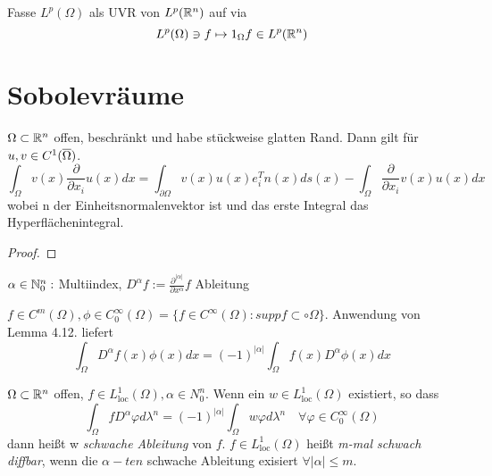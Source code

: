 \documentclass[ngerman]{report}
\begin{document}
	\begin{bem*}
		Fasse $L^p(\Omega)$ als UVR von $L^p(\mathbb{R}^n)$ auf via
			$$ L^p(\Omega) \ni f \mapsto 1_\Omega f \in L^p(\mathbb{R}^n)$$
	\end{bem*}

	\section{Sobolevräume}

		\begin{lemma}
			$\Omega \subset \mathbb{R}^n$ offen, beschränkt und habe stückweise glatten Rand. Dann gilt für $u,v \in C^1(\overline{\Omega})$.
				$$\int_\Omega v(x) \frac{\partial}{\partial x_i} u(x) dx = 
				\int_{\partial \Omega} v(x)u(x) e_i^T n(x) ds(x) - \int_\Omega \frac{\partial}{\partial x_i} v(x) u(x) dx$$
				wobei n der Einheitsnormalenvektor ist und das erste Integral das Hyperflächenintegral.
		\end{lemma}
		\begin{proof}
			\todor
		\end{proof}

	\begin{bem}[Notation]
		$\alpha \in \mathbb{N}_0^n:$ Multiindex, $D^\alpha f := \frac{\partial^|\alpha|}{\partial x^\alpha}f$ Ableitung
	\end{bem}

	\begin{bem}
		$f\in C^m(\Omega), \phi\in C_0^\infty(\Omega) = \{f\in C^\infty(\Omega): suppf\subset \circ\Omega\}.$ Anwendung von Lemma 4.12. liefert 
		 $$ \int_\Omega D^\alpha f(x) \phi(x) dx = (-1)^{|\alpha|}\int_\Omega f(x) D^\alpha \phi(x) dx$$ 
	\end{bem}

	\begin{definition}
		$\Omega \subset \mathbb{R}^n$ offen, $f\in L^1_{\text{loc}}(\Omega), \alpha \in N^n_0$. Wenn ein 
		$w \in L^1_{\text{loc}}(\Omega)$ existiert, so dass 
			$$\int_\Omega f D^\alpha \varphi d\lambda^n = (-1)^|\alpha| \int_\Omega w \varphi d\lambda^n 
			\quad \forall \varphi \in C_0^\infty(\Omega)$$
			dann heißt w \textit{schwache Ableitung} von $f$. $f \in L^1_{\text{loc}}(\Omega)$ heißt \textit{m-mal schwach diffbar}, wenn die $\alpha-ten$ schwache Ableitung exisiert $\forall |\alpha| \leq m$. 
	\end{definition}
	
\end{document}
